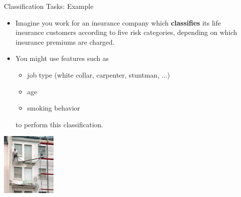 \documentclass[11pt,compress,t,notes=noshow, xcolor=table]{beamer}
\begin{document}

\begin{vbframe}{Classification Tasks: Example}

\begin{itemize}

  \item Imagine you work for an insurance company which \textbf{classifies} its
  life insurance customers according to five risk categories, depending on which 
  insurance premiums are charged.
  
  \item You might use features such as
  
  \begin{itemize}
  
    \item job type (white collar, carpenter, stuntman, ...)
    \item age
    \item smoking behavior
  
  \end{itemize}
  
  to perform this classification.

\end{itemize}

\begin{center}
  \includegraphics[width = 0.2\textwidth]{figure_man/classif_ex_placeholder.jpg} 
\end{center}

\end{vbframe}

\end{document}
